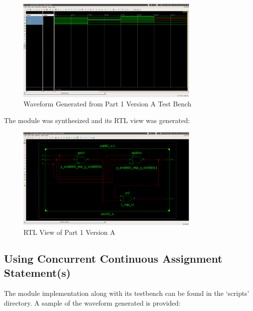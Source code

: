 \documentclass[paper=usletter, fontsize=12pt]{article}
\begin{document}
        \begin{figure}[ht]
            \begin{center}
                \includegraphics[width=0.8\textwidth]{version_a_wav.png}
                \caption{Waveform Generated from Part 1 Version A Test Bench} \label{fig:a_wav}
            \end{center}
        \end{figure}

        The module was synthesized and its RTL view was generated:
        \begin{figure}[ht]
            \begin{center}
                \includegraphics[width=0.8\textwidth]{version_a.png}
                \caption{RTL View of Part 1 Version A} \label{fig:a_rtl}
            \end{center}
        \end{figure}

        \subsection{Using Concurrent Continuous Assignment Statement(s)}
        The module implementation along with its testbench can be found in the `scripts' directory. A sample of the waveform generated is provided:
\end{document}

